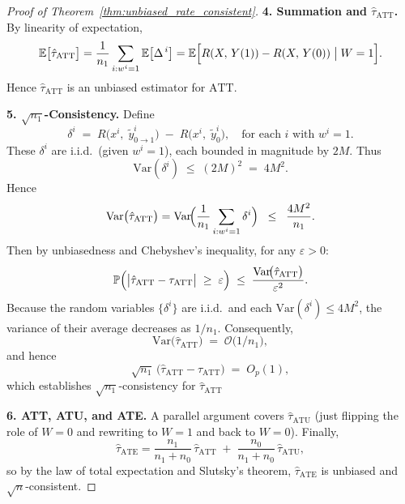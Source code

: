 \documentclass{article}
\theoremstyle{definition}
\begin{document}
\begin{proof}[Proof of Theorem~\ref{thm:unbiased_rate_consistent}]
    \bigskip
    \textbf{4. Summation and \(\hat{\tau}_{\text{ATT}}\).}
    By linearity of expectation,
    \[
    \mathbb{E}\bigl[\hat{\tau}_{\text{ATT}}\bigr]
    =
    \frac{1}{n_1}\sum_{i: w^i=1}
    \mathbb{E}\bigl[\Delta^{\,i}\bigr]
    =
    \mathbb{E}\Bigl[
    R(X,\,Y(1)) - R(X,\,Y(0)) \;\big|\; W=1
    \Bigr].
    \]
    Hence \(\hat{\tau}_{\text{ATT}}\) is an unbiased estimator for \(\text{ATT}\).
    
    \bigskip
    \textbf{5. $\sqrt{n_1}$-Consistency.}
Define 
\[
\delta^i \;=\; R\bigl(x^i,\;\tilde{y}^{i}_{0\to1}\bigr) \;-\; R\bigl(x^i,\;\tilde{y}^{i}_{0}\bigr), \quad \text{for each }i\text{ with }w^i=1.
\]
These $\delta^i$ are i.i.d.\ (given $w^i=1$), each bounded in magnitude by $2M$. Thus
\[
\mathrm{Var}(\delta^i) \;\le\; (2M)^2 \;=\; 4M^2.
\]
Hence
\[
\mathrm{Var}\bigl(\hat{\tau}_{\text{ATT}}\bigr) = \mathrm{Var}\!\Bigl(\frac{1}{n_1}\sum_{i: w^i=1}\delta^i\Bigr) \;\;\le\;\; \frac{4M^2}{n_1}.
\]
Then by unbiasedness and Chebyshev's inequality, for any $\varepsilon>0$:
\[
\mathbb{P}\Bigl(\bigl|\hat{\tau}_{\text{ATT}} - \tau_{\text{ATT}}\bigr|\;\ge\;\varepsilon\Bigr) \;\le\; \frac{\mathrm{Var}\!\bigl(\hat{\tau}_{\text{ATT}}\bigr)}{\varepsilon^2}.
\]
Because the random variables $\{\delta^{i}\}$ are i.i.d.\ and each $\mathrm{Var}(\delta^{i})\le4M^2$, the variance of their average decreases as $1/n_1$. Consequently,
\[
\mathrm{Var}\bigl(\hat{\tau}_{\text{ATT}}\bigr)\;=\;\mathcal{O}\!\bigl(1/n_1\bigr),
\]
and hence 
\[
\sqrt{n_1}\,\bigl(\hat{\tau}_{\text{ATT}} - \tau_{\text{ATT}}\bigr) \;=\; O_{p}(1),
\]
which establishes $\sqrt{n_1}$-consistency for $\hat{\tau}_{\text{ATT}}$

\textbf{6. ATT, ATU, and ATE.}
A parallel argument covers $\hat{\tau}_{\text{ATU}}$ (just flipping the role of $W=0$ and rewriting to $W=1$ and back to $W=0$). Finally,
\[
\hat{\tau}_{\text{ATE}} = \frac{n_1}{n_1 + n_0}\,\hat{\tau}_{\text{ATT}} \;+\; \frac{n_0}{n_1 + n_0}\,\hat{\tau}_{\text{ATU}},
\]
so by the law of total expectation and Slutsky's theorem, $\hat{\tau}_{\text{ATE}}$ is unbiased and $\sqrt{n}$-consistent.  
\end{proof}

\newpage


\end{document}
